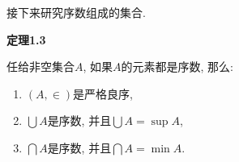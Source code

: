 \documentclass[UTF8]{ctexart}
\begin{document}
\newpage

接下来研究序数组成的集合.

\vspace{10pt}

\hypertarget{sec:定理1.3}{}
\noindent\textbf{定理1.3}

任给非空集合$A$, 如果$A$的元素都是序数, 那么:
\vspace{3pt}
\begin{enumerate}
    \item $(A,\in)$是严格良序,
    \vspace{3pt}
    \item $\displaystyle\bigcup A$是序数, 并且$\displaystyle\bigcup A=\sup A$,
    \vspace{3pt}
    \item $\displaystyle\bigcap A$是序数, 并且$\displaystyle\bigcap A=\min A$.
\end{enumerate}

\end{document}
